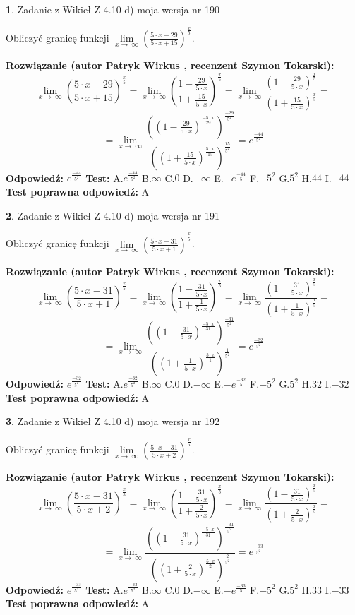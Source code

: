 \documentclass[12pt, a4paper]{article}
\theoremstyle{definition} %
\newtheorem{zad}{}
\newcommand{\zadStart}[1]{\begin{zad}#1\newline}
\newcommand{\zadStop}{\end{zad}}
\newcommand{\rozwStart}[2]{\noindent \textbf{Rozwiązanie (autor #1 , recenzent #2): }\newline}
\newcommand{\rozwStop}{\newline}
\newcommand{\odpStart}{\noindent \textbf{Odpowiedź:}\newline}
\newcommand{\odpStop}{\newline}
\newcommand{\testStart}{\noindent \textbf{Test:}\newline}
\newcommand{\testStop}{\newline}
\newcommand{\kluczStart}{\noindent \textbf{Test poprawna odpowiedź:}\newline}
\newcommand{\kluczStop}{\newline}
\begin{document}
\zadStart{Zadanie z Wikieł Z 4.10 d) moja wersja nr 190}


Obliczyć granicę funkcji  $\lim\limits_{x\to\ \infty}(\frac{5\cdot x-29}{5\cdot x+15})^{\frac{x}{5}}$.
\zadStop
\rozwStart{Patryk Wirkus}{Szymon Tokarski}
$$\lim\limits_{x\to\ \infty}(\frac{5\cdot x-29}{5\cdot x+15})^{\frac{x}{5}} = \lim\limits_{x\to\ \infty}(\frac{1-\frac{29}{5\cdot x}}{1+\frac{15}{5\cdot x}})^{\frac{x}{5}}=\lim\limits_{x\to\ \infty}\frac{(1-\frac{29}{5\cdot x})^{\frac{x}{5}}}{(1+\frac{15}{5\cdot x})^{\frac{x}{5}}}=$$
$$=\lim\limits_{x\to\ \infty}\frac{((1-\frac{29}{5\cdot x})^{\frac{-5\cdot x}{29}})^{\frac{-29}{5^{2}}}}{((1+\frac{15}{5\cdot x})^{\frac{5\cdot x}{15}})^{\frac{15}{5^{2}}}}=e^{\frac{-44}{5^{2}}}$$
\rozwStop
\odpStart
$e^{\frac{-44}{5^{2}}}$
\odpStop
\testStart
A.$e^{\frac{-44}{5^{2}}}$ B.$\infty$ C.$0$ D.$-\infty$ E.$-e^{\frac{-44}{5}}$
F.$-5^{2}$ G.$5^{2}$
H.$44$
I.$-44$
\testStop
\kluczStart
A
\kluczStop



\zadStart{Zadanie z Wikieł Z 4.10 d) moja wersja nr 191}


Obliczyć granicę funkcji  $\lim\limits_{x\to\ \infty}(\frac{5\cdot x-31}{5\cdot x+1})^{\frac{x}{5}}$.
\zadStop
\rozwStart{Patryk Wirkus}{Szymon Tokarski}
$$\lim\limits_{x\to\ \infty}(\frac{5\cdot x-31}{5\cdot x+1})^{\frac{x}{5}} = \lim\limits_{x\to\ \infty}(\frac{1-\frac{31}{5\cdot x}}{1+\frac{1}{5\cdot x}})^{\frac{x}{5}}=\lim\limits_{x\to\ \infty}\frac{(1-\frac{31}{5\cdot x})^{\frac{x}{5}}}{(1+\frac{1}{5\cdot x})^{\frac{x}{5}}}=$$
$$=\lim\limits_{x\to\ \infty}\frac{((1-\frac{31}{5\cdot x})^{\frac{-5\cdot x}{31}})^{\frac{-31}{5^{2}}}}{((1+\frac{1}{5\cdot x})^{\frac{5\cdot x}{1}})^{\frac{1}{5^{2}}}}=e^{\frac{-32}{5^{2}}}$$
\rozwStop
\odpStart
$e^{\frac{-32}{5^{2}}}$
\odpStop
\testStart
A.$e^{\frac{-32}{5^{2}}}$ B.$\infty$ C.$0$ D.$-\infty$ E.$-e^{\frac{-32}{5}}$
F.$-5^{2}$ G.$5^{2}$
H.$32$
I.$-32$
\testStop
\kluczStart
A
\kluczStop



\zadStart{Zadanie z Wikieł Z 4.10 d) moja wersja nr 192}


Obliczyć granicę funkcji  $\lim\limits_{x\to\ \infty}(\frac{5\cdot x-31}{5\cdot x+2})^{\frac{x}{5}}$.
\zadStop
\rozwStart{Patryk Wirkus}{Szymon Tokarski}
$$\lim\limits_{x\to\ \infty}(\frac{5\cdot x-31}{5\cdot x+2})^{\frac{x}{5}} = \lim\limits_{x\to\ \infty}(\frac{1-\frac{31}{5\cdot x}}{1+\frac{2}{5\cdot x}})^{\frac{x}{5}}=\lim\limits_{x\to\ \infty}\frac{(1-\frac{31}{5\cdot x})^{\frac{x}{5}}}{(1+\frac{2}{5\cdot x})^{\frac{x}{5}}}=$$
$$=\lim\limits_{x\to\ \infty}\frac{((1-\frac{31}{5\cdot x})^{\frac{-5\cdot x}{31}})^{\frac{-31}{5^{2}}}}{((1+\frac{2}{5\cdot x})^{\frac{5\cdot x}{2}})^{\frac{2}{5^{2}}}}=e^{\frac{-33}{5^{2}}}$$
\rozwStop
\odpStart
$e^{\frac{-33}{5^{2}}}$
\odpStop
\testStart
A.$e^{\frac{-33}{5^{2}}}$ B.$\infty$ C.$0$ D.$-\infty$ E.$-e^{\frac{-33}{5}}$
F.$-5^{2}$ G.$5^{2}$
H.$33$
I.$-33$
\testStop
\kluczStart
A
\kluczStop
\end{document}
